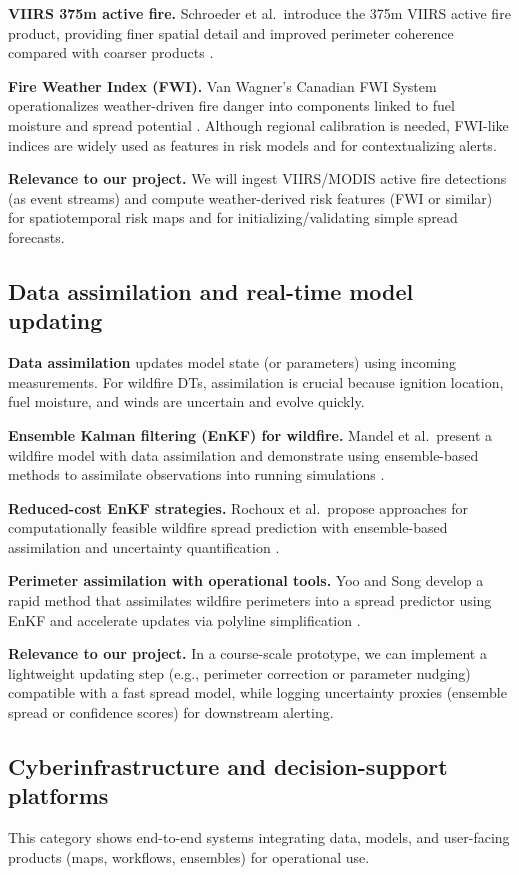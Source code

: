 \documentclass[acmsmall,screen,nonacm]{acmart}
\begin{document}
\textbf{VIIRS 375m active fire.} Schroeder et al.\ introduce the 375m VIIRS active fire product, providing finer spatial
detail and improved perimeter coherence compared with coarser products \cite{schroeder2014viirs}.

\textbf{Fire Weather Index (FWI).} Van Wagner's Canadian FWI System operationalizes weather-driven fire danger into
components linked to fuel moisture and spread potential \cite{vanwagner1987fwi}. Although regional calibration is
needed, FWI-like indices are widely used as features in risk models and for contextualizing alerts.

\textbf{Relevance to our project.} We will ingest VIIRS/MODIS active fire detections (as event streams) and compute
weather-derived risk features (FWI or similar) for spatiotemporal risk maps and for initializing/validating simple
spread forecasts.

\subsection{Data assimilation and real-time model updating}
\textbf{Data assimilation} updates model state (or parameters) using incoming measurements. For wildfire DTs,
assimilation is crucial because ignition location, fuel moisture, and winds are uncertain and evolve quickly.

\textbf{Ensemble Kalman filtering (EnKF) for wildfire.} Mandel et al.\ present a wildfire model with data assimilation
and demonstrate using ensemble-based methods to assimilate observations into running simulations \cite{mandel2008wildland}.

\textbf{Reduced-cost EnKF strategies.} Rochoux et al.\ propose approaches for computationally feasible wildfire spread
prediction with ensemble-based assimilation and uncertainty quantification \cite{rochoux2014enkf}.

\textbf{Perimeter assimilation with operational tools.} Yoo and Song develop a rapid method that assimilates wildfire
perimeters into a spread predictor using EnKF and accelerate updates via polyline simplification \cite{yoo2023rapid}.

\textbf{Relevance to our project.} In a course-scale prototype, we can implement a lightweight updating step
(e.g., perimeter correction or parameter nudging) compatible with a fast spread model, while logging uncertainty
proxies (ensemble spread or confidence scores) for downstream alerting.

\subsection{Cyberinfrastructure and decision-support platforms}
This category shows end-to-end systems integrating data, models, and user-facing products (maps, workflows,
ensembles) for operational use.
\end{document}
